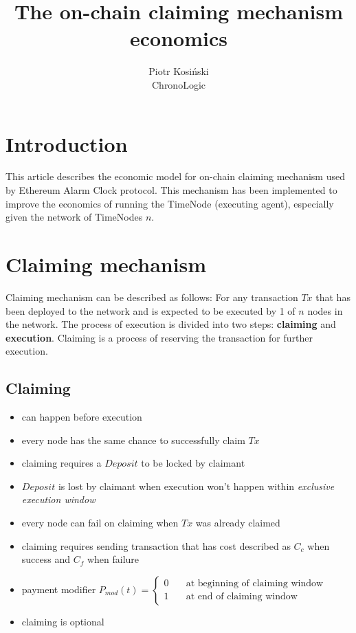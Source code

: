 \documentclass{article}
\title{The on-chain claiming mechanism economics}
\author{Piotr Kosiński\\ChronoLogic}
\begin{document}
\maketitle
\section{Introduction}
This article describes the economic model for on-chain claiming mechanism used by Ethereum Alarm Clock protocol. This mechanism has been implemented to improve the economics of running the TimeNode (executing agent), especially given the network of TimeNodes $n$.
\section{Claiming mechanism}
Claiming mechanism can be described as follows:
For any transaction $Tx$ that has been deployed to the network and is expected to be executed by 1 of $n$ nodes in the network. The process of execution is divided into two steps:
\textbf{claiming} and \textbf{execution}. Claiming is a process of reserving the transaction for further execution.

\subsection{Claiming}
\begin{itemize}
\item can happen before execution
\item every node has the same chance to successfully claim $Tx$
\item claiming requires a $Deposit$ to be locked by claimant
\item $Deposit$ is lost by claimant when execution won't happen within \textit{exclusive execution window}
\item every node can fail on claiming when $Tx$ was already claimed
\item claiming requires sending transaction that has cost described as $C_{c}$ when success and $C_{f}$ when failure
\item payment modifier $P_{mod}(t)=\begin{cases}
0 & \quad \text{at beginning of claiming window}\\
1 & \quad \text{at end of claiming window}
\end{cases}$ 
\item claiming is optional
\end{itemize}
\end{document}
